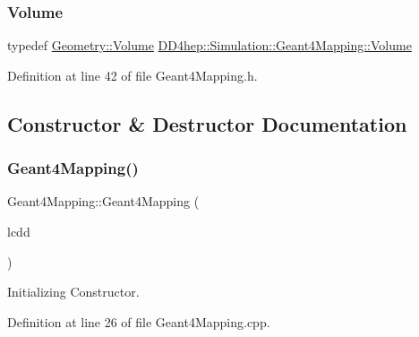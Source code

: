 \subsubsection{\texorpdfstring{Volume}{Volume}}
{\footnotesize\ttfamily typedef \hyperlink{class_d_d4hep_1_1_geometry_1_1_volume}{Geometry\+::\+Volume} \hyperlink{class_d_d4hep_1_1_simulation_1_1_geant4_mapping_a86c52918ea76c0cbd7a4bffb971f33a5}{D\+D4hep\+::\+Simulation\+::\+Geant4\+Mapping\+::\+Volume}}



Definition at line 42 of file Geant4\+Mapping.\+h.



\subsection{Constructor \& Destructor Documentation}
\hypertarget{class_d_d4hep_1_1_simulation_1_1_geant4_mapping_a60aefec5f9d5816368c7e3db4065b546}{}\label{class_d_d4hep_1_1_simulation_1_1_geant4_mapping_a60aefec5f9d5816368c7e3db4065b546} 
\subsubsection{\texorpdfstring{Geant4\+Mapping()}{Geant4Mapping()}}
{\footnotesize\ttfamily Geant4\+Mapping\+::\+Geant4\+Mapping (\begin{DoxyParamCaption}\item[{\hyperlink{class_d_d4hep_1_1_simulation_1_1_geant4_mapping_a7b098323f9ea570a13d220fe3f09da41}{L\+C\+DD} \&}]{lcdd }\end{DoxyParamCaption})}



Initializing Constructor. 



Definition at line 26 of file Geant4\+Mapping.\+cpp.

\hypertarget{class_d_d4hep_1_1_simulation_1_1_geant4_mapping_a497e1e6164765a418d66430d4d404708}{}\label{class_d_d4hep_1_1_simulation_1_1_geant4_mapping_a497e1e6164765a418d66430d4d404708} 
